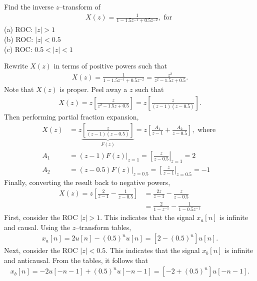 \documentclass{report}
\begin{document}
\begin{example}
    Find the inverse $z$--transform of  
    \begin{align*}
        X(z) = \frac{1}{1-1.5z^{-1}+0.5z^{-2}}, \text{ for }
    \end{align*}
    (a) ROC: $|z|>1$ \\
    (b) ROC: $|z|<0.5$ \\
    (c) ROC: $0.5<|z|<1$
\end{example}
\begin{solution}
    Rewrite $X(z)$ in terms of positive powers such that 
    \begin{align*}
        X(z) = \frac{1}{1-1.5z^{-1}+0.5z^{-2}} = \frac{z^2}{z^2-1.5z+0.5}.
    \end{align*}
    Note that $X(z)$ is proper. Peel away a $z$ such that 
    \begin{align*}
        X(z) = z \left[\frac{z}{z^2-1.5z+0.5}\right] = z\left[\frac{z}{(z-1)(z-0.5)}\right].
    \end{align*}
    Then performing partial fraction expansion,
    \begin{align*}
        X(z) &= z\underbrace{\left[\frac{z}{(z-1)(z-0.5)}\right]}_{F(z)} = z\left[\frac{A_1}{z-1} + \frac{A_2}{z-0.5}\right], \text{ where } \\
        A_1 &= (z-1)F(z)\big|_{z=1} = \left[\frac{z}{z-0.5}\right|_{z=1} = 2 \\
        A_2 &= (z-0.5)F(z)\big|_{z=0.5} = \left[\frac{z}{z-1}\right|_{z=0.5} = -1
    \end{align*}
    Finally, converting the result back to negative powers,
    \begin{align*}
        X(z) = z\left[\frac{2}{z-1} - \frac{1}{z-0.5}\right] &= \frac{2z}{z-1} - \frac{z}{z-0.5} \\ 
        &= \frac{2}{1-z^{-1}} - \frac{1}{1-0.5z^{-1}}
    \end{align*}
    First, consider the ROC $|z|>1$. This indicates that the signal $x_a[n]$ is infinite and causal. Using the $z$--transform tables, 
    \begin{align*}
        x_a[n] = 2u[n] - (0.5)^nu[n] = [2-(0.5)^n]u[n].
    \end{align*}
    Next, consider the ROC $|z|<0.5$. This indicates that the signal $x_b[n]$ is infinite and anticausal. From the tables, it follows that 
    \begin{align*}
        x_b[n] = -2u[-n-1] + (0.5)^nu[-n-1] = [-2+(0.5)^n]u[-n-1]. 
    \end{align*}

\end{solution}
\end{document}
